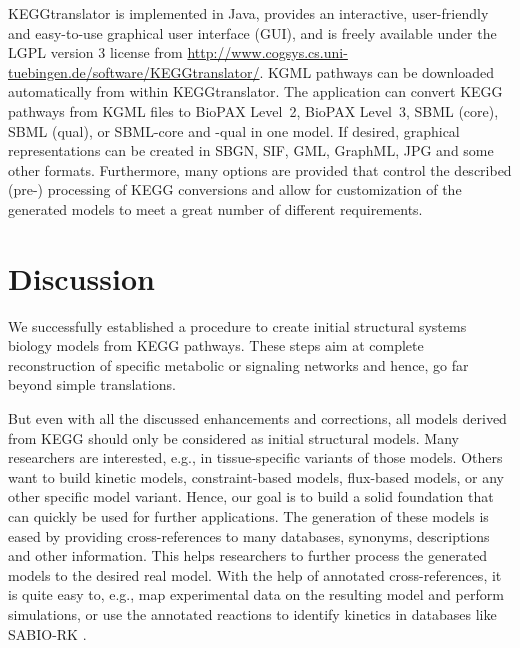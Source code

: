 \documentclass[10pt]{bmc_article}
\newenvironment{bmcformat}{\baselineskip20pt\sloppy\setboolean{publ}{false}}{\baselineskip20pt\sloppy}
\begin{document}
\begin{bmcformat}
KEGGtranslator is implemented in Java\texttrademark, provides an interactive, user-friendly and easy-to-use graphical user interface (GUI), and is freely available under the LGPL version 3 license from \url{http://www.cogsys.cs.uni-tuebingen.de/software/KEGGtranslator/}. KGML pathways can be downloaded automatically from within KEGGtranslator. The application can convert KEGG pathways from KGML files to BioPAX Level~2, BioPAX Level~3, SBML (core), SBML (qual), or SBML-core and -qual in one model. If desired, graphical representations can be created in SBGN, SIF, GML, GraphML, JPG and some other formats. Furthermore, many options are provided that control the described (pre-) processing of KEGG conversions and allow for customization of the generated models to meet a great number of different requirements.


\section*{Discussion}

We successfully established a procedure to create initial structural systems biology models from KEGG pathways. These steps aim at complete reconstruction of specific metabolic or signaling networks and hence, go far beyond simple translations.

But even with all the discussed enhancements and corrections, all models derived from KEGG should only be considered as initial structural models. Many researchers are interested, e.g., in tissue-specific variants of those models. Others want to build kinetic models, constraint-based models, flux-based models, or any other specific model variant. Hence, our goal is to build a solid foundation that can quickly be used for further applications. The generation of these models is eased by providing cross-references to many databases, synonyms, descriptions and other information. This helps researchers to further process the generated models to the desired real model. With the help of annotated cross-references, it is quite easy to, e.g., map experimental data on the resulting model and perform simulations, or use the annotated reactions to identify kinetics in databases like SABIO-RK \cite{SabioRK}.


\end{bmcformat}
\end{document}
